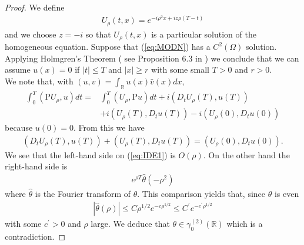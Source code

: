 \documentclass{article}
\def\R{\mathbb{R}}
\begin{document}
\begin{proof}
	We define
	\begin{align*}
		U_{\rho}(t,x)= e^{-i\rho^{2}x + iz\rho(T-t)} 
	\end{align*}
	and we choose $ z =-i $ so that $ U_{\rho}(t,x) $ is a particular
	solution of the homogeneous equation.
	Suppose that (\ref{eq:MODN}) has a \(C^{2}(\Omega)\) solution. Applying Holmgren's Theorem ( see Proposition 6.3 in \cite{NTLEC})  we conclude that we can assume \(u(x)=0\) if \(\left|t\right| \leq T\) and \(\left|x\right| \geq r\) with some small \(T>0\) and \(r>0\).\\	
	We note that, with $ (u,v) = \int_{\R}u(x)\bar{v}(x)dx $,
	\[
	\begin{aligned}
		\int_{0}^{T}\left(\mathrm{P} U_{\rho}, u\right) dt= & \int_{0}^{T}\left(U_{\rho}, \mathrm{P} u\right) dt+i\left(D_{t} U_{\rho}(T), u(T)\right) \\
		& +i\left(U_{\rho}(T), D_{t} u(T)\right)
		-i\left(U_{\rho}(0), D_{t} u(0)\right)
	\end{aligned}
	\]
	because \(u(0)=0\). From this we have
	\begin{equation}
		\label{eq:IDE1}
		\begin{aligned}
			\left(D_{t} U_{\rho}(T), u(T)\right)+\left(U_{\rho}(T), D_{t} u(T)\right) =\left(U_{\rho}(0), D_{t} u(0)\right).
		\end{aligned}
	\end{equation}
	We see that the left-hand side on (\ref{eq:IDE1}) is \(O\left(\rho\right)\). On the other hand the right-hand side is	
	\begin{align*}
		e^{\rho T}\hat{\theta}(-\rho^{2})
	\end{align*}
	where \(\hat{\theta}\) is the Fourier transform of \(\theta\). This comparison yields that, since $ \theta$ is even 	
	\begin{align*}
		|\hat{\theta}(\rho)| \leq C \rho^{1/2} e^{-c \rho^{1 / 2}} \leq C^{\prime} e^{-c^{\prime} \rho^{1 / 2}}
	\end{align*}
	with some \(c^{\prime}>0\) and $ \rho $ large. We   deduce that \(\theta \in \gamma_{0}^{(2)}(\R)\) which is a contradiction.
\end{proof}
\end{document}
